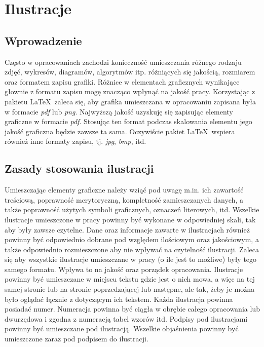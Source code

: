 \chapter{Ilustracje}
\section{Wprowadzenie}
Często w opracowaniach zachodzi konieczność umieszczania różnego rodzaju zdjęć, wykresów, diagramów, algorytmów itp. różniących się jakością, rozmiarem oraz formatem zapisu grafiki. Różnice w elementach graficznych wynikające głownie z formatu zapisu mogę znacząco wpłynąć na jakość pracy. Korzystając z pakietu \LaTeX\ zaleca się, aby grafika umieszczana w opracowaniu zapisana była w formacie \textit{pdf} lub \textit{png}. Najwyższą jakość uzyskuję się zapisując elementy graficzne w formacie \textit{pdf}. Stosując ten format podczas skalowania elementu jego jakość graficzna będzie zawsze ta sama. Oczywiście pakiet \LaTeX\ wspiera również inne formaty zapisu, tj. \textit{jpg}, \textit{bmp}, itd.
\section{Zasady stosowania ilustracji}
Umieszczając elementy graficzne należy wziąć pod uwagę m.in. ich zawartość treściową, poprawność merytoryczną, kompletność zamieszczanych danych, a także poprawność użytych symboli graficznych, oznaczeń literowych, itd. Wszelkie ilustracje umieszczone w pracy powinny być wykonane w odpowiedniej skali, tak aby były zawsze czytelne. Dane oraz informacje zawarte w ilustracjach również powinny być odpowiednio dobrane pod względem ilościowym oraz jakościowym, a także odpowiednio rozmieszczone aby nie wpływać na czytelność ilustracji. Zaleca się aby wszystkie ilustracje umieszczane w pracy (o ile jest to możliwe) były tego samego formatu. Wpływa to na jakość oraz porządek opracowania. Ilustracje powinny być umieszczane w miejscu tekstu gdzie jest o nich mowa, a więc na tej samej stronie lub na stronie poprzedzającej lub następne, ale tak, żeby je można było oglądać łącznie z dotyczącym ich tekstem. Każda ilustracja powinna posiadać numer. Numeracja powinna być ciągła w obrębie  całego opracowania lub dwurzędowa i zgodna z numeracją tabel wzorów itd. Podpisy pod 
ilustracjami powinny być umieszczane pod ilustracją. Wszelkie objaśnienia powinny być umieszczone 
zaraz pod podpisem do ilustracji.
